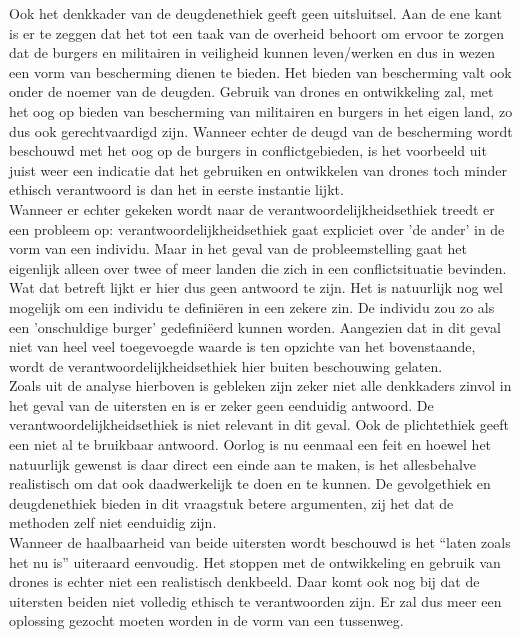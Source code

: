 Ook het denkkader van de deugdenethiek geeft geen uitsluitsel. Aan de ene kant is er te zeggen dat het tot een taak van de overheid behoort om ervoor te zorgen dat de burgers en militairen in veiligheid kunnen leven/werken en dus in wezen een vorm van bescherming dienen te bieden. Het bieden van bescherming valt ook onder de noemer van de deugden. Gebruik van drones en ontwikkeling zal, met het oog op bieden van bescherming van militairen en burgers in het eigen land, zo dus ook gerechtvaardigd zijn. Wanneer echter de deugd van de bescherming wordt beschouwd met het oog op de burgers in conflictgebieden, is het voorbeeld uit \cite{guardian} juist weer een indicatie dat het gebruiken en ontwikkelen van drones toch minder ethisch verantwoord is dan het in eerste instantie lijkt.\\

Wanneer er echter gekeken wordt naar de verantwoordelijkheidsethiek treedt er een probleem op: verantwoordelijkheidsethiek gaat expliciet over 'de ander' in de vorm van een individu. Maar in het geval van de probleemstelling gaat het eigenlijk alleen over twee of meer landen die zich in een conflictsituatie bevinden. Wat dat betreft lijkt er hier dus geen antwoord te zijn. Het is natuurlijk nog wel mogelijk om een individu te defini\"eren in een zekere zin. De individu zou zo als een 'onschuldige burger' gedefini\"eerd kunnen worden. Aangezien dat in dit geval niet van heel veel toegevoegde waarde is ten opzichte van het bovenstaande, wordt de verantwoordelijkheidsethiek hier buiten beschouwing gelaten.\\




Zoals uit de analyse hierboven is gebleken zijn zeker niet alle denkkaders zinvol in het geval van de uitersten en is er zeker geen eenduidig antwoord. De verantwoordelijkheidsethiek is niet relevant in dit geval. Ook de plichtethiek geeft een niet al te bruikbaar antwoord. Oorlog is nu eenmaal een feit en hoewel het natuurlijk gewenst is daar direct een einde aan te maken, is het allesbehalve realistisch om dat ook daadwerkelijk te doen en te kunnen. De gevolgethiek en deugdenethiek bieden in dit vraagstuk betere argumenten, zij het dat de methoden zelf niet eenduidig zijn.\\

Wanneer de haalbaarheid van beide uitersten wordt beschouwd is het ``laten zoals het nu is'' uiteraard eenvoudig. Het stoppen met de ontwikkeling en gebruik van drones is echter niet een realistisch denkbeeld. Daar komt ook nog bij dat de uitersten beiden niet volledig ethisch te verantwoorden zijn. Er zal dus meer een oplossing gezocht moeten worden in de vorm van een tussenweg.

